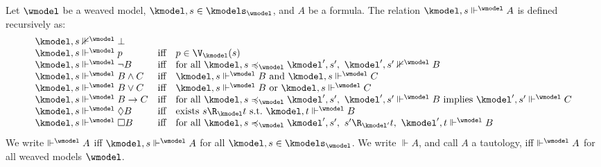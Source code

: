 {\begin{definition}\label{def:sat:wmodel:pointed}
  Let $\wmodel$ be a weaved model, $\kmodel,s \in \kmodels_{\wmodel}$, and $A$ be a formula.
  The relation $\kmodel, s \Vdash^{\wmodel} A$ is defined recursively as:
  \[\begin{array}{lcl}
    \kmodel, s \nVdash^{\wmodel} \bot \\
    \kmodel, s \Vdash^{\wmodel} p & \text{iff} & p \in \V_{\kmodel}(s) \\
    \kmodel, s \Vdash^{\wmodel} \lnot B & \text{iff} & \text{for all } \kmodel,s \preccurlyeq_{\wmodel} \kmodel',s',~ \kmodel', s' \nVdash^{\wmodel} B \\
    \kmodel, s \Vdash^{\wmodel} B \land C & \text{iff} & \kmodel, s \Vdash^{\wmodel} B \text{ and } \kmodel, s \Vdash^{\wmodel} C \\
    \kmodel, s \Vdash^{\wmodel} B \lor C & \text{iff} & \kmodel, s \Vdash^{\wmodel} B \text{ or } \kmodel, s \Vdash^{\wmodel} C \\
    \kmodel, s \Vdash^{\wmodel} B \to C & \text{iff} & \text{for all } \kmodel,s \preccurlyeq_{\wmodel} \kmodel',s',~ \kmodel', s' \Vdash^{\wmodel} B \text{ implies } \kmodel', s' \Vdash^{\wmodel} C \\
    \kmodel, s \Vdash^{\wmodel} \Diamond B & \text{iff} & \text{exists } s \R_{\kmodel} t \text{ s.t.\ } \kmodel, t \Vdash^{\wmodel} B \\
    \kmodel, s \Vdash^{\wmodel} \Box B & \text{iff} & \text{for all } \kmodel,s \preccurlyeq_{\wmodel} \kmodel',s',~ s' \R_{\kmodel'} t,~ \kmodel', t \Vdash^{\wmodel} B
  \end{array}\]
  We write $\Vdash^{\wmodel} A$ iff $\kmodel,s \Vdash^{\wmodel} A$ for all $\kmodel,s \in \kmodels_{\wmodel}$.
  We write $\Vdash A$, and call $A$ a tautology, iff $\Vdash^{\wmodel} A$ for all weaved models $\wmodel$.
\end{definition}
}


